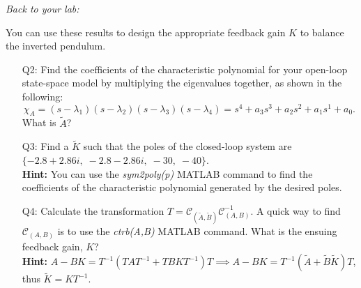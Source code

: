 \documentclass[12pt]{report}
\newcommand\drew[1]{\textcolor{red}{#1}}
\begin{document}
\noindent \emph{Back to your lab:}

You can use these results to design the appropriate feedback gain $K$ to balance the inverted pendulum.
\begin{enumerate}[Question]
    \item[Q2:] Find the coefficients of the characteristic polynomial for your open-loop state-space model by multiplying the eigenvalues together, as shown in the following:
          \[
              \chi_{A} = (s-\lambda_1)(s-\lambda_2)(s-\lambda_3)(s-\lambda_4) = s^4 + a_3 s^3 + a_2 s^2 + a_1 s^1 + a_0.
          \]
          What is $\tilde{A}$?\\
    \item[Q3:] Find a $\tilde{K}$ such that the poles of the closed-loop system are $\{-2.8 + 2.86i, \; -2.8 - 2.86i, \; -30, \; -40\}$.\\
          \textbf{Hint:} You can use the \emph{sym2poly(p)} MATLAB command to find the coefficients of the characteristic polynomial generated by the desired poles.\\
    \item[Q4:] Calculate the transformation $T=\mathcal{C}_{(\tilde{A},\tilde{B})} \mathcal{C}_{(A,B)}^{-1}$. A quick way to find $\mathcal{C}_{(A,B)}$ is to use the \emph{ctrb(A,B)} MATLAB command. What is the ensuing feedback gain, $K$?\\
          \textbf{Hint:} $A-BK= T^{-1}(TAT^{-1} + TBKT^{-1})T \implies A-BK = T^{-1}(\tilde{A}+\tilde{B}\tilde{K})T$, thus $\tilde{K}=KT^{-1}$.\\
\end{enumerate}
\end{document}

